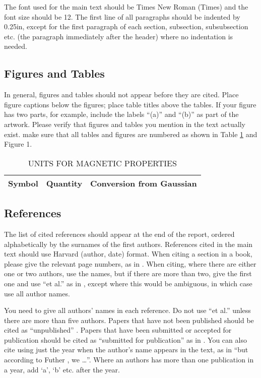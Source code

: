\documentclass[12pt,a4paper]{article}
\begin{document}
The font used for the main text should be Times New Roman (Times) and the font size should be 12.  The first line of all paragraphs should be indented by 0.25in, except for the first paragraph of each section, subsection, subsubsection etc. (the paragraph immediately after the header) where no indentation is needed.

\subsection{Figures and Tables}
In general, figures and tables should not appear before they are cited.  Place figure captions below the figures; place table titles above the tables.  If your figure has two parts, for example, include the labels ``(a)'' and ``(b)'' as part of the artwork.  Please verify that figures and tables you mention in the text actually exist.  make sure that all tables and figures are numbered as shown in Table \ref{units} and Figure 1.

\begin{table}[htb]
\centering
\caption{UNITS FOR MAGNETIC PROPERTIES}
\vspace*{6pt}
\label{units}
\begin{tabular}{ccc}\hline\hline
Symbol & Quantity & Conversion from Gaussian \\ \hline
\end{tabular}
\end{table}

\subsection{References}

The list of cited references should appear at the end of the report, ordered alphabetically by the surnames of the first authors.  References cited in the main text should use Harvard (author, date) format.  When citing a section in a book, please give the relevant page numbers, as in \cite[p293]{budgen}.  When citing, where there are either one or two authors, use the names, but if there are more than two, give the first one and use ``et al.'' as in  , except where this would be ambiguous, in which case use all author names.

You need to give all authors' names in each reference.  Do not use ``et al.'' unless there are more than five authors.  Papers that have not been published should be cited as ``unpublished'' \cite{euther}.  Papers that have been submitted or accepted for publication should be cited as ``submitted for publication'' as in \cite{futher} .  You can also cite using just the year when the author's name appears in the text, as in ``but according to Futher \citeyear{futher}, we \dots''.  Where an authors has more than one publication in a year, add `a', `b' etc. after the year.
\end{document}
